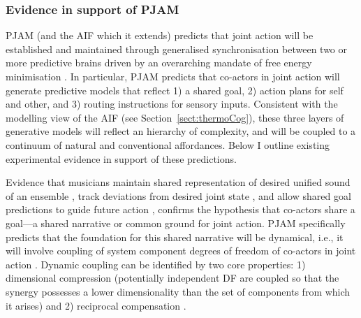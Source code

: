 \begin{CJK}{UTF8}{gbsn}
\subsubsection{Evidence in support of PJAM}
PJAM (and the AIF which it extends) predicts that joint action will be established and maintained through generalised synchronisation between two or more predictive brains driven by an overarching mandate of free energy minimisation \citep{Friston2015}.  In particular, PJAM predicts that co-actors in joint action will generate predictive models that reflect 1) a shared goal, 2) action plans for self and other, and 3) routing instructions for sensory inputs.  Consistent with the modelling view of the AIF (see Section~\ref{sect:thermoCog}), these three layers of generative models will reflect an hierarchy of complexity, and will be coupled to a continuum of natural and conventional affordances.  Below I outline existing experimental evidence in support of these predictions.

Evidence that musicians maintain shared representation of desired unified sound of an ensemble \citep{Keller2008}, track deviations from desired joint state \citep{Loehr2013}, and allow shared goal predictions to guide future action \citep{Loehr2016}, confirms the hypothesis that co-actors share a goal---a shared narrative or common ground for joint action.  PJAM specifically predicts that the foundation for this shared narrative will be dynamical, i.e., it will involve coupling of system component degrees of freedom of co-actors in joint action \citep{Turvey1978,Schmidt1990}. Dynamic coupling can be identified by two core properties:  1) dimensional compression (potentially independent DF are coupled so that the synergy possesses a lower dimensionality than the set of components from which it arises) and 2) reciprocal compensation \citep[the ability of one component of a synergy to react to changes in others][]{Riley2011}.


\end{CJK}
